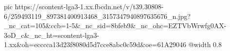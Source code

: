  
 
 
 
 

\ifcmt
  pic https://scontent-lga3-1.xx.fbcdn.net/v/t39.30808-6/259493119_897381400913468_3157347940897635676_n.jpg?_nc_cat=105&ccb=1-5&_nc_sid=8bfeb9&_nc_ohc=EZTVbWrwfg0AX-3oD_c&_nc_ht=scontent-lga3-1.xx&oh=ecccca13d23f8080d5d7cce8abc0c59d&oe=61A29046
  @width 0.8
\fi
